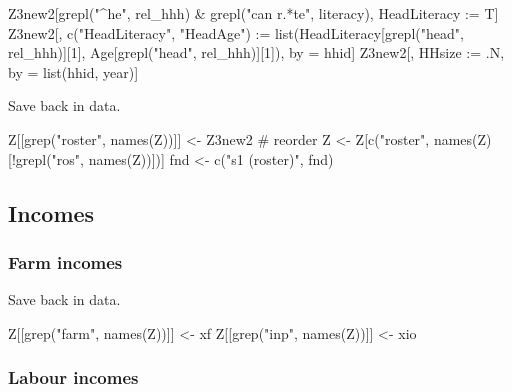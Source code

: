 \begin{Schunk}
\begin{Sinput}
Z3new2[grepl("^he", rel_hhh) & grepl("can r.*te", literacy), HeadLiteracy := T]
Z3new2[, c("HeadLiteracy", "HeadAge") := 
	list(HeadLiteracy[grepl("head", rel_hhh)][1], Age[grepl("head", rel_hhh)][1]), 
	by = hhid]
Z3new2[, HHsize := .N, by = list(hhid, year)]
\end{Sinput}
\end{Schunk}
Save back in data.
\begin{Schunk}
\begin{Sinput}
Z[[grep("roster", names(Z))]] <- Z3new2
# reorder
Z <- Z[c("roster", names(Z)[!grepl("ros", names(Z))])]
fnd <- c("s1 (roster)", fnd)
\end{Sinput}
\end{Schunk}

\subsection{Incomes}


\subsubsection{Farm incomes}



Save back in data.
\begin{Schunk}
\begin{Sinput}
Z[[grep("farm", names(Z))]] <- xf
Z[[grep("inp", names(Z))]] <- xio
\end{Sinput}
\end{Schunk}

\subsubsection{Labour incomes}


